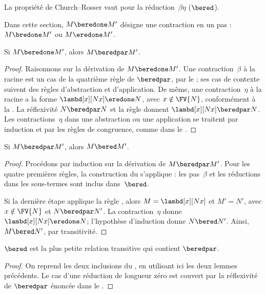 \documentclass[../../../include/open-logic-section]{subfiles}
\begin{document}

La propriété de Church--Rosser vaut pour
la réduction~$\beta\eta$ ($\bered$).

Dans cette section, $M\beredone M'$ désigne
une contraction en un pas :
$M\bredone M'$ ou $M\eredone M'$.

\begin{lem}
Si $M \beredone M'$, alors
$M \beredpar M'$.
\end{lem}

\begin{proof}
Raisonnons sur la dérivation de
$M\beredone M'$. Une contraction~$\beta$
à la racine est un cas de la quatrième
règle de $\beredpar$, par le
; ses cas de contexte
suivent des règles d'abstraction et
d'application. De même, une contraction~$\eta$
à la racine a la forme
$\lambd[x][Nx]\eredone N$, avec
$x\notin\FV{N}$, conformément à la
.
La réflexivité $N\beredpar N$ et la règle
 donnent
$\lambd[x][Nx]\beredpar N$.
Les contractions~$\eta$ dans une
abstraction ou une application se
traitent par induction et par les règles
de congruence, comme dans le
.
\end{proof}

\begin{lem}
Si $M \beredpar M'$, alors
$M \bered M'$.
\end{lem}

\begin{proof}
Procédons par induction sur la dérivation
de $M\beredpar M'$. Pour les quatre
premières règles, la construction du
 s'applique :
les pas~$\beta$ et les réductions dans
les sous-termes sont inclus dans~$\bered$.

Si la dernière étape applique la règle
, alors
$M=\lambd[x][Nx]$ et $M'=N'$, avec
$x\notin\FV{N}$ et $N\beredpar N'$.
La contraction~$\eta$ donne
$\lambd[x][Nx]\eredone N$;
l'hypothèse d'induction donne
$N\bered N'$. Ainsi,
$M\bered N'$, par transitivité.
\end{proof}

\begin{lem}
$\bered$ est la plus petite relation
transitive qui contient $\beredpar$.
\end{lem}

\begin{proof}
On reprend les deux inclusions du
, en utilisant ici
les deux lemmes précédents. Le cas
d'une réduction de longueur zéro est
couvert par la réflexivité de $\beredpar$
énoncée dans le .
\end{proof}
\end{document}
